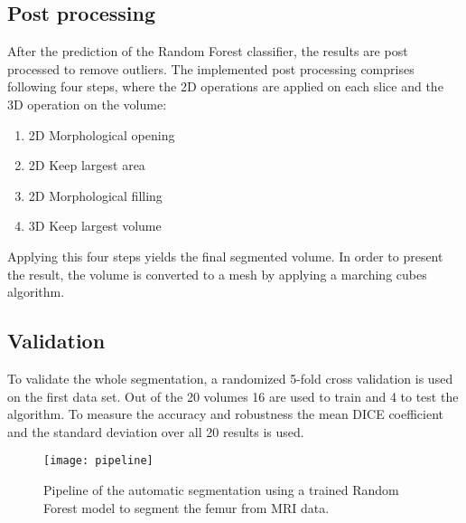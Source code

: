 \subsection{Post processing}
After the prediction of the Random Forest classifier, the results are post processed to remove outliers. The implemented post processing comprises following four steps, where the 2D operations are applied on each slice and the 3D operation on the volume:
\begin{enumerate}
\item 2D Morphological opening
\item 2D Keep largest area
\item 2D Morphological filling
\item 3D Keep largest volume
\end{enumerate}
Applying this four steps yields the final segmented volume. In order to present the result, the volume is converted to a mesh by applying a marching cubes algorithm. 
\subsection{Validation}
To validate the whole segmentation, a randomized 5-fold cross validation \cite{cross} is used on the first data set. Out of the 20 volumes 16 are used to train and 4 to test the algorithm. To measure the accuracy and robustness the mean DICE coefficient and the standard deviation over all 20 results is used.
\begin{figure*}[!t]
\centering
\texttt{[image: pipeline]}
\caption{Pipeline of the automatic segmentation using a trained Random Forest model to segment the femur from MRI data.}
\label{fig:pipeline}
\end{figure*}

